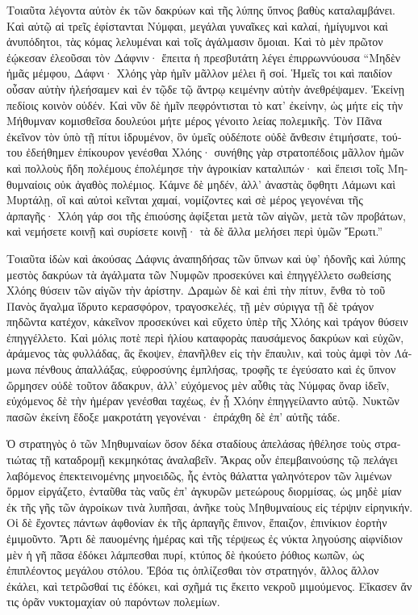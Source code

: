 \documentclass{book}
\begin{document}
\begin{pairs}
\begin{Leftside}
\begin{greek}
  Τοιαῦτα λέγοντα αὐτὸν ἐκ τῶν δακρύων καὶ τῆς λύπης ὕπνος βαθὺς καταλαμβάνει. Καὶ αὐτῷ αἱ τρεῖς ἐφίστανται Νύμφαι, μεγάλαι γυναῖκες καὶ καλαί, ἡμίγυμνοι καὶ ἀνυπόδητοι, τὰς κόμας λελυμέναι καὶ τοῖς ἀγάλμασιν ὅμοιαι.  Καὶ τὸ μὲν πρῶτον ἐῴκεσαν ἐλεοῦσαι τὸν Δάφνιν· ἔπειτα ἡ πρεσβυτάτη λέγει ἐπιρρωννύουσα “Μηδὲν ἡμᾶς μέμφου, Δάφνι· Χλόης γὰρ ἡμῖν μᾶλλον μέλει ἢ σοί. Ἡμεῖς τοι καὶ παιδίον οὖσαν αὐτὴν ἠλεήσαμεν καὶ ἐν τῷδε τῷ ἄντρῳ κειμένην αὐτὴν ἀνεθρέψαμεν.  Ἐκείνῃ πεδίοις κοινὸν οὐδέν. Καὶ νῦν δὲ ἡμῖν πεφρόντισται τὸ κατ’ ἐκείνην, ὡς μήτε εἰς τὴν Μήθυμναν κομισθεῖσα δουλεύοι μήτε μέρος γένοιτο λείας πολεμικῆς.  Τὸν Πᾶνα ἐκεῖνον τὸν ὑπὸ τῇ πίτυι ἱδρυμένον, ὃν ὑμεῖς οὐδέποτε οὐδὲ ἄνθεσιν ἐτιμήσατε, τούτου ἐδεήθημεν ἐπίκουρον γενέσθαι Χλόης· συνήθης γὰρ στρατοπέδοις μᾶλλον ἡμῶν καὶ πολλοὺς ἤδη πολέμους ἐπολέμησε τὴν ἀγροικίαν καταλιπών· καὶ ἔπεισι τοῖς Μηθυμναίοις οὐκ ἀγαθὸς πολέμιος.  Κάμνε δὲ μηδέν, ἀλλ’ ἀναστὰς ὄφθητι Λάμωνι καὶ Μυρτάλῃ, οἳ καὶ αὐτοὶ κεῖνται χαμαί, νομίζοντες καὶ σὲ μέρος γεγονέναι τῆς ἁρπαγῆς· Χλόη γάρ σοι τῆς ἐπιούσης ἀφίξεται μετὰ τῶν αἰγῶν, μετὰ τῶν προβάτων, καὶ νεμήσετε κοινῇ καὶ συρίσετε κοινῇ· τὰ δὲ ἄλλα μελήσει περὶ ὑμῶν Ἔρωτι.”
\pend


  Τοιαῦτα ἰδὼν καὶ ἀκούσας Δάφνις ἀναπηδήσας τῶν ὕπνων καὶ ὑφ’ ἡδονῆς καὶ λύπης μεστὸς δακρύων τὰ ἀγάλματα τῶν Νυμφῶν προσεκύνει καὶ ἐπηγγέλλετο σωθείσης Χλόης θύσειν τῶν αἰγῶν τὴν ἀρίστην.  Δραμὼν δὲ καὶ ἐπὶ τὴν πίτυν, ἔνθα τὸ τοῦ Πανὸς ἄγαλμα ἵδρυτο κερασφόρον, τραγοσκελές, τῇ μὲν σύριγγα τῇ δὲ τράγον πηδῶντα κατέχον, κἀκεῖνον προσεκύνει καὶ εὔχετο ὑπὲρ τῆς Χλόης καὶ τράγον θύσειν ἐπηγγέλλετο.  Καὶ μόλις ποτὲ περὶ ἡλίου καταφορὰς παυσάμενος δακρύων καὶ εὐχῶν, ἀράμενος τὰς φυλλάδας, ἃς ἔκοψεν, ἐπανῆλθεν εἰς τὴν ἔπαυλιν, καὶ τοὺς ἀμφὶ τὸν Λάμωνα πένθους ἀπαλλάξας,  εὐφροσύνης ἐμπλήσας, τροφῆς τε ἐγεύσατο καὶ ἐς ὕπνον ὥρμησεν οὐδὲ τοῦτον ἄδακρυν, ἀλλ’ εὐχόμενος μὲν αὖθις τὰς Νύμφας ὄναρ ἰδεῖν, εὐχόμενος δὲ τὴν ἡμέραν γενέσθαι ταχέως, ἐν ᾗ Χλόην ἐπηγγείλαντο αὐτῷ. Νυκτῶν πασῶν ἐκείνη ἔδοξε μακροτάτη γεγονέναι· ἐπράχθη δὲ ἐπ’ αὐτῆς τάδε.
\pend


  Ὁ στρατηγὸς ὁ τῶν Μηθυμναίων ὅσον δέκα σταδίους ἀπελάσας ἠθέλησε τοὺς στρατιώτας τῇ καταδρομῇ κεκμηκότας ἀναλαβεῖν. Ἄκρας οὖν ἐπεμβαινούσης τῷ πελάγει λαβόμενος ἐπεκτεινομένης μηνοειδῶς,  ἧς ἐντὸς θάλαττα γαληνότερον τῶν λιμένων ὅρμον εἰργάζετο, ἐνταῦθα τὰς ναῦς ἐπ’ ἀγκυρῶν μετεώρους διορμίσας, ὡς μηδὲ μίαν ἐκ τῆς γῆς τῶν ἀγροίκων τινὰ λυπῆσαι, ἀνῆκε τοὺς Μηθυμναίους εἰς τέρψιν εἰρηνικήν.  Οἱ δὲ ἔχοντες πάντων ἀφθονίαν ἐκ τῆς ἁρπαγῆς ἔπινον, ἔπαιζον, ἐπινίκιον ἑορτὴν ἐμιμοῦντο. Ἄρτι δὲ παυομένης ἡμέρας καὶ τῆς τέρψεως ἐς νύκτα ληγούσης αἰφνίδιον μὲν ἡ γῆ πᾶσα ἐδόκει λάμπεσθαι πυρί, κτύπος δὲ ἠκούετο ῥόθιος κωπῶν, ὡς ἐπιπλέοντος μεγάλου στόλου.  Ἐβόα τις ὁπλίζεσθαι τὸν στρατηγόν, ἄλλος ἄλλον ἐκάλει, καὶ τετρῶσθαί τις ἐδόκει, καὶ σχῆμά τις ἔκειτο νεκροῦ μιμούμενος. Εἴκασεν ἄν τις ὁρᾶν νυκτομαχίαν οὐ παρόντων πολεμίων.
\pend



\end{greek}
\end{Leftside}
\end{pairs}
\end{document}
